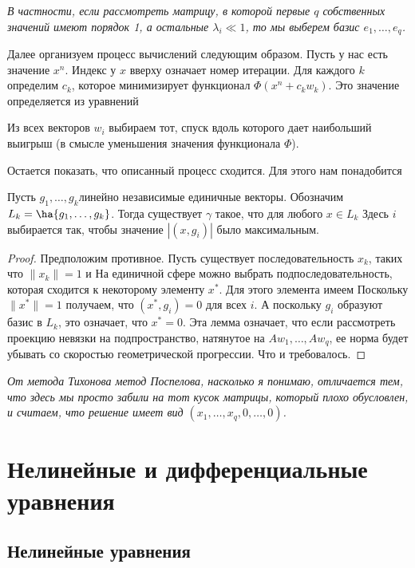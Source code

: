 \documentclass[a4paper]{article}
\begin{document}
\textsl{В частности, если рассмотреть матрицу, в которой первые $q$
собственных значений имеют порядок 1, а остальные $\lambda_i\ll 1$,
то мы выберем базис $e_1,\dots, e_q$. }

 Далее организуем процесс вычислений следующим образом. Пусть у нас есть значение $x^n$.
 Индекс у $x$ вверху означает номер итерации.  Для каждого $k$ определим $c_k$, которое минимизирует функционал
 $\Phi(x^n+c_kw_k)$. Это значение определяется из уравнений

Из всех векторов $w_i$ выбираем тот, спуск вдоль которого дает
наибольший выигрыш (в смысле уменьшения значения функционала
$\Phi$).

Остается показать, что описанный процесс сходится. Для этого нам
понадобится
\begin{lemma}
 Пусть $g_1, \dots, g_k$\т линейно независимые единичные векторы.
 Обозначим $L_k = \ha{g_1, \dots, g_k}$. Тогда существует
 $\gamma$ такое, что для любого $x\in L_k$
 Здесь $i$ выбирается так, чтобы значение $|(x, g_i)|$ было
 максимальным.
\end{lemma}
\begin{proof}
Предположим противное. Пусть существует последовательность $x_k$,
таких что $\|x_k\|=1$ и 
На единичной сфере можно выбрать подпоследовательность, которая
сходится к некоторому элементу $x^*$. Для этого элемента имеем
 Поскольку $\|x^*\|=1$ получаем, что $(x^*, g_i)=0$ для всех $i$. А поскольку $g_i$ образуют базис в $L_k$, это означает,
что $x^*=0$. Эта лемма означает, что если рассмотреть проекцию
невязки на подпространство, натянутое на $Aw_1, \dots, Aw_q$, ее
норма будет убывать со скоростью геометрической прогрессии. Что и
требовалось.
\end{proof}

\textsl{От метода Тихонова метод Поспелова, насколько я понимаю,
отличается тем, что здесь мы просто забили на тот кусок матрицы,
который плохо обусловлен, и считаем, что решение имеет вид $(x_1,
\dots, x_q, 0,\dots,0)$.}


\section{Нелинейные и дифференциальные уравнения}

\subsection{Нелинейные уравнения}
\end{document}
